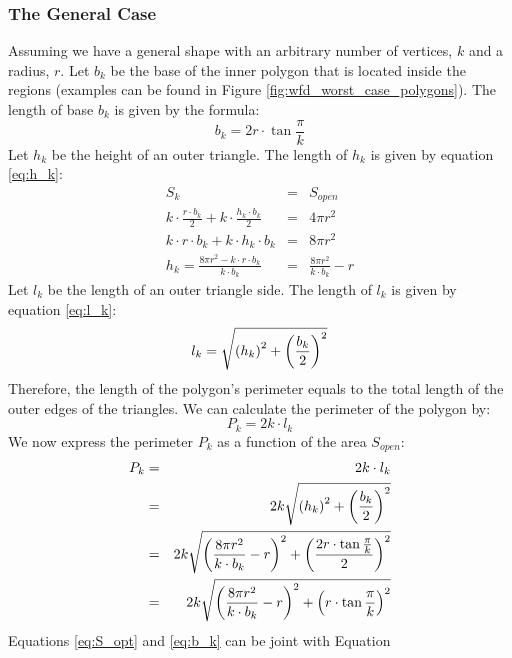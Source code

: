 \subsubsection{The General Case}
Assuming we have a general shape with an arbitrary number of vertices, $k$ and a
radius, $r$.
Let $b_k$ be the base of the inner polygon that is located inside the \openspace
regions (examples can be found in Figure \ref{fig:wfd_worst_case_polygons}). The
length of base $b_k$ is given by the formula:
\begin{equation}\label{eq:b_k}
b_k = 2r\cdot\tan{\frac{\pi}{k}}
\end{equation}
Let $h_k$ be the %
height of an outer triangle.
The length of $h_k$ is given by equation \eqref{eq:h_k}:
\begin{eqnarray}\label{eq:h_k}
S_k &=& S_{open} \nonumber\\
k\cdot\frac{r\cdot b_k}{2} + k\cdot\frac{h_k\cdot b_k}{2} &=& 4\pi r^2
\nonumber\\
k\cdot r\cdot b_k + k\cdot h_k\cdot b_k &=& 8\pi r^2 \nonumber\\
h_k = \frac{8\pi r^2 - k\cdot r\cdot b_k}{k\cdot b_k} &=& 
	  \frac{8\pi r^2}{k\cdot b_k} - r
\end{eqnarray}
Let $l_k$ be the length of an outer triangle side. The length of $l_k$ is given
by equation \eqref{eq:l_k}:
\begin{equation}\label{eq:l_k}
l_k = \sqrt{{\left(h_k\right)}^2 + {\left(\frac{b_k}{2}\right)}^2}
\end{equation}
Therefore, the length of the polygon's perimeter equals to the total
length of the outer edges of the triangles. We can calculate the
perimeter of the polygon by:
\begin{equation}
P_k = 2k\cdot l_k
\end{equation}
We now express the perimeter $P_k$ as a function of the area $S_{open}$:
\begin{eqnarray}\label{eq:P_to_S_1}
P_k &=& 2k\cdot l_k \nonumber\\
 &=& 2k\sqrt{{\left(h_k\right)}^2 + {\left(\frac{b_k}{2}\right)}^2} \nonumber\\
 &=& 2k\sqrt{{\left(\frac{8\pi r^2}{k\cdot b_k} - r\right)}^2 +
 {\left(\frac{2r\cdot\tan{\frac{\pi}{k}}}{2}\right)}^2} \nonumber\\
 &=& 2k\sqrt{{\left(\frac{8\pi r^2}{k\cdot b_k} - r\right)}^2 +
 {\left(r\cdot\tan{\frac{\pi}{k}}\right)}^2}
\end{eqnarray} 
Equations \eqref{eq:S_opt} and \eqref{eq:b_k} can be joint with Equation
